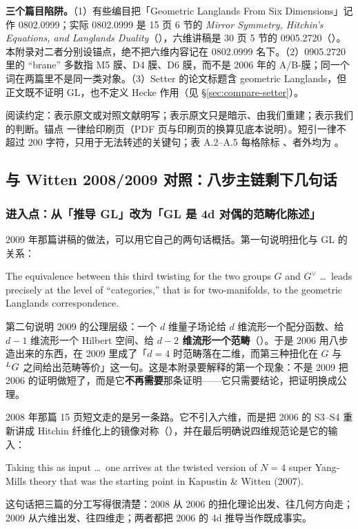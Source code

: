 \begin{warn}
\textbf{三个篇目陷阱。}（1）有些编目把「Geometric Langlands From Six Dimensions」记作 0802.0999；实际 0802.0999 是 15 页 6 节的 \emph{Mirror Symmetry, Hitchin's Equations, and Langlands Duality}（），六维讲稿是 30 页 5 节的 0905.2720（）。本附录对二者分别设锚点，绝不把六维内容记在 0802.0999 名下。\pA（2）0905.2720 里的 ``brane'' 多数指 M5 膜、D4 膜、D6 膜，而不是 2006 年的 A/B-膜；同一个词在两篇里不是同一类对象。\pA（3）Setter 的论文标题含 geometric Langlands，但正文既不证明 GL，也不定义 Hecke 作用（见 \S\ref{sec:compare-setter}）。\pA
\end{warn}

阅读约定：\pA 表示原文或对照文献明写；\pB 表示原文只是暗示、由我们重建；\pC 表示我们的判断。锚点  一律给印刷页（PDF 页与印刷页的换算见底本说明）。短引一律不超过 200 字符，只用于无法转述的关键句；表 A.2--A.5 每格除标 \pB、\pC 者外均为 \pA。

\subsection{与 Witten 2008/2009 对照：八步主链剩下几句话}
\label{sec:compare-witten}

\subsubsection*{进入点：从「推导 GL」改为「GL 是 4d 对偶的范畴化陈述」}

2009 年那篇讲稿的做法，可以用它自己的两句话概括。第一句说明扭化与 GL 的关系：\pA
\begin{origquote}
The equivalence between this third twisting for the two groups $G$ and $G^\vee$ \ldots\ leads precisely at the level of ``categories,'' that is for two-manifolds, to the geometric Langlands correspondence. 
\end{origquote}
第二句说明 2009 的公理层级：一个 $d$ 维量子场论给 $d$ 维流形一个配分函数、给 $d-1$ 维流形一个 Hilbert 空间、给 \textbf{$d-2$ 维流形一个范畴}（）。\pA 于是 2006 用八步造出来的东西，在 2009 里成了「$d=4$ 时范畴落在二维，而第三种扭化在 $G$ 与 ${}^{L}G$ 之间给出范畴等价」这一句。这是本附录要解释的第一个现象：不是 2009 把 2006 的证明做短了，而是它\textbf{不再需要}那条证明——它只需要结论，把证明换成公理。

2008 年那篇 15 页短文走的是另一条路。它不引入六维，而是把 2006 的 S3--S4 重新讲成 Hitchin 纤维化上的镜像对称（），并在最后明确说四维规范论是它的输入：\pA
\begin{origquote}
Taking this as input \ldots\ one arrives at the twisted version of $N=4$ super Yang-Mills theory that was the starting point in Kapustin \& Witten (2007). 
\end{origquote}
这句话把三篇的分工写得很清楚：2008 从 2006 的扭化理论出发、往几何方向走；2009 从六维出发、往四维走；两者都把 2006 的 4d 推导当作既成事实。

